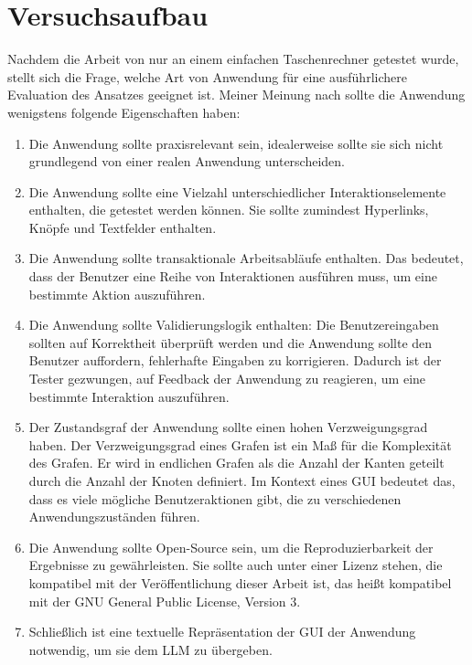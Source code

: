 \chapter{Versuchsaufbau}
\label{ch:ExperimentalSetup}

Nachdem die Arbeit von  nur an einem einfachen Taschenrechner getestet wurde, stellt sich die Frage, welche Art von Anwendung für eine ausführlichere Evaluation des Ansatzes geeignet ist.
Meiner Meinung nach sollte die Anwendung wenigstens folgende Eigenschaften haben:

\begin{enumerate}
    \item
        Die Anwendung sollte praxisrelevant sein, idealerweise sollte sie sich nicht grundlegend von einer realen Anwendung unterscheiden.
    \item
        Die Anwendung sollte eine Vielzahl unterschiedlicher Interaktionselemente ent\-hal\-ten, die getestet werden können. 
        Sie sollte zumindest Hyperlinks, Knöpfe und Textfelder enthalten.
    \item
        Die Anwendung sollte transaktionale Arbeitsabläufe enthalten.
        Das bedeutet, dass der Benutzer eine Reihe von Interaktionen ausführen muss, um eine bestimmte Aktion auszuführen.
    \item
        Die Anwendung sollte Validierungslogik enthalten: Die Benutzereingaben sollten auf Korrektheit überprüft werden und die Anwendung sollte den Benutzer auffordern, fehlerhafte Eingaben zu korrigieren.
        Dadurch ist der Tester gezwungen, auf Feedback der Anwendung zu reagieren, um eine bestimmte Interaktion auszuführen.
    \item
        Der Zustandsgraf der Anwendung sollte einen hohen Verzweigungsgrad haben.
        Der Verzweigungsgrad eines Grafen ist ein Maß für die Komplexität des Grafen.
        Er wird in endlichen Grafen als die Anzahl der Kanten geteilt durch die Anzahl der Knoten definiert.
        Im Kontext eines GUI bedeutet das, dass es viele mögliche Benutzeraktionen gibt, die zu verschiedenen Anwendungszuständen führen.
    \item 
        Die Anwendung sollte Open-Source sein, um die Reproduzierbarkeit der Ergebnisse zu gewährleisten.
        Sie sollte auch unter einer Lizenz stehen, die kompatibel mit der Veröffentlichung dieser Arbeit ist, das heißt kompatibel mit der GNU General Public License, Version 3.
    \item Schließlich ist eine textuelle Repräsentation der GUI der Anwendung notwendig, um sie dem LLM zu übergeben.
\end{enumerate}

